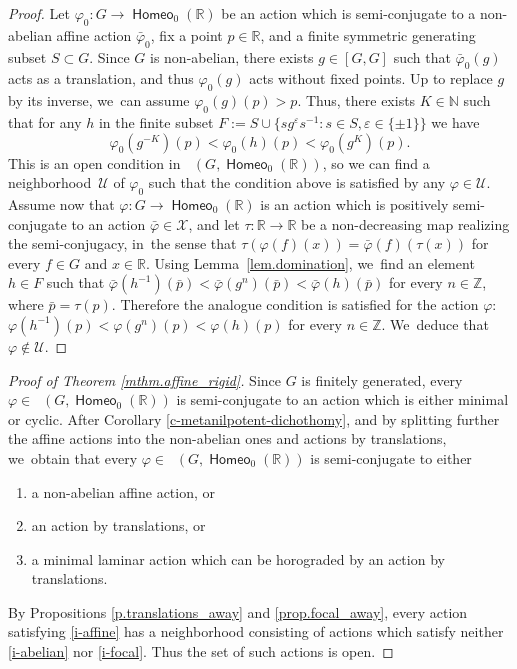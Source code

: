 \documentclass[JEP,XML,SOM,Unicode,NoFloatCountersInSection,published]{cedram}
\let\epsilon\varepsilon
\theoremstyle{definition}
\DeclareMathOperator{\homeo}{\mathsf{Homeo}}
\DeclareMathOperator{\Homirr}{\mathsf{Hom}_{\mathrm{irr}}}
\newcommand{\R}{\mathbb{R}}
\newcommand{\N}{\mathbb N}
\newcommand{\Z}{\mathbb Z}
\begin{document}
\begin{proof}
Let $\varphi_0\colon G\to\homeo_0(\R)$ be an action which is semi-conjugate to a non-abelian affine action $\bar\varphi_0$, fix a point $p\in\R$, and a finite symmetric generating subset $S\subset G$. Since $G$ is non-abelian, there exists $g\in[G,G]$ such that $\bar\varphi_0(g)$ acts as a translation, and thus $\varphi_0(g)$ acts without fixed points. Up to replace $g$ by its inverse, we~can assume $\varphi_0(g)(p)>p$. Thus, there exists $K\in\N$ such that for any $h$ in the finite subset $F:=S\cup \{sg^\epsilon s^{-1}:s\in S, \epsilon\in \{\pm 1\}\}$ we have
\[
\varphi_0(g^{-K})(p)<\varphi_0(h)(p)<\varphi_0(g^K)(p).
\]
This is an open condition in $\Homirr(G, \homeo_0(\R))$, so we can find a neighborhood~$\mathcal U$ of $\varphi_0$ such that the condition above is satisfied by any $\varphi\in \mathcal U$. Assume now that $\varphi\colon G\to \homeo_0(\R)$ is an action which is positively semi-conjugate to an action $\bar{\varphi}\in \mathcal{X}$, and let $\tau\colon \R \to \R$ be a non-decreasing map realizing the semi-conjugacy, in~the sense that $\tau(\varphi(f)(x))=\bar{\varphi}(f)(\tau(x))$ for every $f\in G$ and $x\in \R$. Using Lemma~\ref{lem.domination}, we~find an element $h\in F$ such that $\bar{\varphi}(h^{-1})(\bar p)<\bar{\varphi}(g^n)(\bar p)<\bar{\varphi}(h)(\bar p)$ for every $n\in \Z$, where $\bar{p}=\tau(p)$. Therefore the analogue condition is satisfied for the action $\varphi$: $\varphi(h^{-1})(p)<\varphi(g^n)(p)<\varphi(h)(p)$ for every $n\in \Z$. We~deduce that $\varphi\notin \mathcal U$.
\end{proof}

\begin{proof}[Proof of Theorem \ref{mthm.affine_rigid}]
Since $G$ is finitely generated, every $\varphi\in \Homirr(G, \homeo_0(\R))$ is semi-conjugate to an action which is either minimal or cyclic. After Corollary \ref{c-metanilpotent-dichothomy}, and by splitting further the affine actions into the non-abelian ones and actions by translations, we~obtain that every $\varphi\in \Homirr(G, \homeo_0(\R))$ is semi-conjugate to either
\begin{enumerate}
\item \label{i-affine} a non-abelian affine action, or
\item \label{i-abelian} an action by translations, or
\item \label{i-focal} a minimal laminar action which can be horograded by an action by translations.
\end{enumerate}
By Propositions \ref{p.translations_away} and \ref{prop.focal_away}, every action satisfying \eqref{i-affine} has a neighborhood consisting of actions which satisfy neither \eqref{i-abelian} nor \eqref{i-focal}. Thus the set of such actions is open.
\end{proof}
\end{document}
